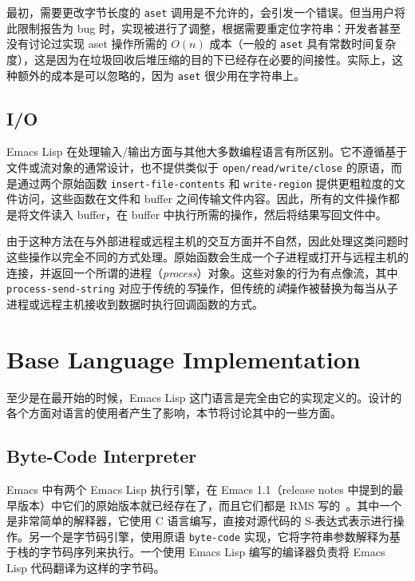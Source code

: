 \documentclass[format=acmsmall,screen]{acmart}
\begin{document}
最初，需要更改字节长度的 \texttt{aset} 调用是不允许的，会引发一个错误。但当用户将此限制报告为 bug 时，实现被进行了调整，根据需要重定位字符串：开发者甚至没有讨论过实现 aset 操作所需的 $O(n)$ 成本（一般的 \texttt{aset} 具有常数时间复杂度），这是因为在垃圾回收后堆压缩的目的下已经存在必要的间接性。实际上，这种额外的成本是可以忽略的，因为 \texttt{aset} 很少用在字符串上。

\subsection{I/O}

Emacs Lisp 在处理输入/输出方面与其他大多数编程语言有所区别。它不遵循基于文件或流对象的通常设计，也不提供类似于 \texttt{open/read/write/close} 的原语，而是通过两个原始函数 \texttt{insert-file-contents} 和 \texttt{write-region} 提供更粗粒度的文件访问，这些函数在文件和 buffer 之间传输文件内容。因此，所有的文件操作都是将文件读入 buffer，在 buffer 中执行所需的操作，然后将结果写回文件中。

由于这种方法在与外部进程或远程主机的交互方面并不自然，因此处理这类问题时这些操作以完全不同的方式处理。原始函数会生成一个子进程或打开与远程主机的连接，并返回一个所谓的进程（\emph{process}）对象。这些对象的行为有点像流，其中 \texttt{process-send-string} 对应于传统的\emph{写}操作，但传统的\emph{读}操作被替换为每当从子进程或远程主机接收到数据时执行回调函数的方式。

\section{Base Language Implementation}
\label{sec:base-language-implementation}

至少是在最开始的时候，Emacs Lisp 这门语言是完全由它的实现定义的。设计的各个方面对语言的使用者产生了影响，本节将讨论其中的一些方面。

\subsection{Byte-Code Interpreter}
\label{sec:byte-code-interpreter}

Emacs 中有两个 Emacs Lisp 执行引擎，在 Emacs 1.1（release notes 中提到的最早版本）中它们的原始版本就已经存在了，而且它们都是 RMS 写的~\cite{RMS-compiler}。其中一个是非常简单的解释器，它使用 C 语言编写，直接对源代码的 S-表达式表示进行操作。另一个是字节码引擎，使用原语 \texttt{byte-code} 实现，它将字符串参数解释为基于栈的字节码序列来执行。一个使用 Emacs Lisp 编写的编译器负责将 Emacs Lisp 代码翻译为这样的字节码。
\end{document}
